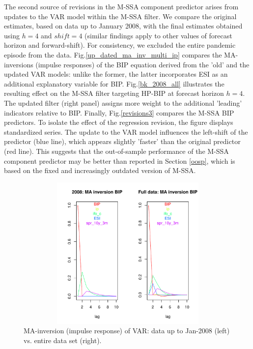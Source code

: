 \documentclass[a4paper]{article}
\begin{document}
The second source of revisions in the M-SSA component predictor arises from updates to the VAR model within the M-SSA filter. We compare the original estimates, based on data up to January 2008, with the final estimates obtained using $h=4$ and $shift=4$ (similar findings apply to other values of forecast horizon and forward-shift).  For consistency, we excluded the entire pandemic episode from the data. Fig.\eqref{up_dated_ma_inv_multi_ip} compares the MA-inversions (impulse responses) of the BIP equation derived from the 'old' and the updated VAR models: unlike the former, the latter incorporates ESI as an additional explanatory variable for BIP. Fig.\eqref{bk_2008_all} illustrates the resulting effect on the M-SSA filter targeting HP-BIP at forecast horizon $h=4$. The updated filter (right panel) assigns more weight to the additional 'leading' indicators relative to BIP. Finally, Fig.\eqref{revisions3} compares the M-SSA BIP predictors. To isolate the effect of the regression revision, the figure displays standardized series. The update to the VAR model influences the left-shift of the predictor (blue line), which appears slightly 'faster' than the original predictor (red line). This suggests that the out-of-sample performance of the M-SSA component predictor may be better than reported in Section \eqref{oosp}, which is based on the fixed and increasingly outdated version of M-SSA.
\begin{figure}[H]\begin{center}\includegraphics[height=3in, width=4.5in]{./Figures/up_dated_ma_inv_multi_ip.pdf}\caption{MA-inversion (impulse response) of VAR: data up to Jan-2008 (left) vs. entire data set (right).\label{up_dated_ma_inv_multi_ip}}\end{center}\end{figure}
\end{document}
